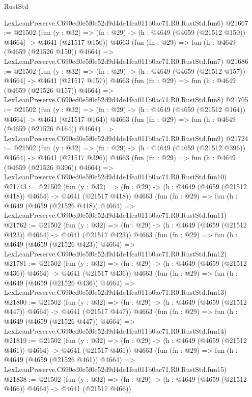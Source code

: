 \begin{lexlean}{RustStd}
\begin{coremodule}
    LexLeanPreserve.C690ed0e5f0e52d9d4de1fea011b0ac71.R0.RustStd.fun6)
@21667 := @21502
    (fun (y : @32) => (fn : @29) -> (h : @4649 (@4659 (@21512 @150)) @4664) -> @4641 (@21517 @150))
    @4663
    (fun (fn : @29) =>
    fun (h : @4649 (@4659 (@21526 @150)) @4664) =>
    LexLeanPreserve.C690ed0e5f0e52d9d4de1fea011b0ac71.R0.RustStd.fun7)
@21686 := @21502
    (fun (y : @32) => (fn : @29) -> (h : @4649 (@4659 (@21512 @157)) @4664) -> @4641 (@21517 @157))
    @4663
    (fun (fn : @29) =>
    fun (h : @4649 (@4659 (@21526 @157)) @4664) =>
    LexLeanPreserve.C690ed0e5f0e52d9d4de1fea011b0ac71.R0.RustStd.fun8)
@21705 := @21502
    (fun (y : @32) => (fn : @29) -> (h : @4649 (@4659 (@21512 @164)) @4664) -> @4641 (@21517 @164))
    @4663
    (fun (fn : @29) =>
    fun (h : @4649 (@4659 (@21526 @164)) @4664) =>
    LexLeanPreserve.C690ed0e5f0e52d9d4de1fea011b0ac71.R0.RustStd.fun9)
@21724 := @21502
    (fun (y : @32) => (fn : @29) -> (h : @4649 (@4659 (@21512 @396)) @4664) -> @4641 (@21517 @396))
    @4663
    (fun (fn : @29) =>
    fun (h : @4649 (@4659 (@21526 @396)) @4664) =>
    LexLeanPreserve.C690ed0e5f0e52d9d4de1fea011b0ac71.R0.RustStd.fun10)
@21743 := @21502
    (fun (y : @32) => (fn : @29) -> (h : @4649 (@4659 (@21512 @418)) @4664) -> @4641 (@21517 @418))
    @4663
    (fun (fn : @29) =>
    fun (h : @4649 (@4659 (@21526 @418)) @4664) =>
    LexLeanPreserve.C690ed0e5f0e52d9d4de1fea011b0ac71.R0.RustStd.fun11)
@21762 := @21502
    (fun (y : @32) => (fn : @29) -> (h : @4649 (@4659 (@21512 @423)) @4664) -> @4641 (@21517 @423))
    @4663
    (fun (fn : @29) =>
    fun (h : @4649 (@4659 (@21526 @423)) @4664) =>
    LexLeanPreserve.C690ed0e5f0e52d9d4de1fea011b0ac71.R0.RustStd.fun12)
@21781 := @21502
    (fun (y : @32) => (fn : @29) -> (h : @4649 (@4659 (@21512 @436)) @4664) -> @4641 (@21517 @436))
    @4663
    (fun (fn : @29) =>
    fun (h : @4649 (@4659 (@21526 @436)) @4664) =>
    LexLeanPreserve.C690ed0e5f0e52d9d4de1fea011b0ac71.R0.RustStd.fun13)
@21800 := @21502
    (fun (y : @32) => (fn : @29) -> (h : @4649 (@4659 (@21512 @447)) @4664) -> @4641 (@21517 @447))
    @4663
    (fun (fn : @29) =>
    fun (h : @4649 (@4659 (@21526 @447)) @4664) =>
    LexLeanPreserve.C690ed0e5f0e52d9d4de1fea011b0ac71.R0.RustStd.fun14)
@21819 := @21502
    (fun (y : @32) => (fn : @29) -> (h : @4649 (@4659 (@21512 @461)) @4664) -> @4641 (@21517 @461))
    @4663
    (fun (fn : @29) =>
    fun (h : @4649 (@4659 (@21526 @461)) @4664) =>
    LexLeanPreserve.C690ed0e5f0e52d9d4de1fea011b0ac71.R0.RustStd.fun15)
@21838 := @21502
    (fun (y : @32) => (fn : @29) -> (h : @4649 (@4659 (@21512 @466)) @4664) -> @4641 (@21517 @466))

\end{coremodule}
\end{lexlean}
